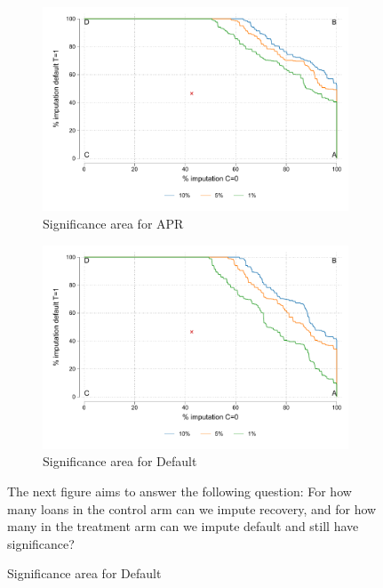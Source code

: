 \begin{figure}[H]
        \caption{Interpolation on bounding censoring}
    \label{interpolation_censoring_imp}
    \begin{center}
   \begin{subfigure}{0.49\textwidth}
   \caption{Significance area for APR}
        \centering
        \includegraphics[width=\textwidth]{Figuras/frontera_sig_apr.pdf}
    \end{subfigure}     
    \begin{subfigure}{0.49\textwidth}
   \caption{Significance area for Default }
        \centering
        \includegraphics[width=\textwidth]{Figuras/frontera_sig_def_imp.pdf}
    \end{subfigure} 
    \end{center}
     \scriptsize  The next figure aims to answer the following question: For how many loans in the control arm can we impute recovery, and for how many in the treatment arm can we impute default and still have significance?

\end{figure}
